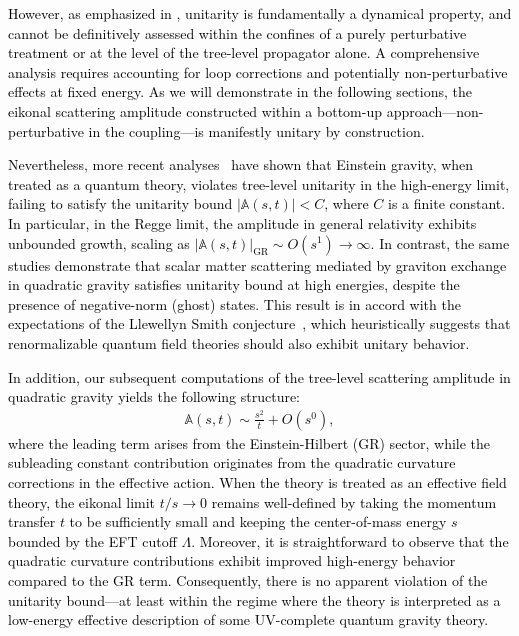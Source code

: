 \textcolor{black}{
However, as emphasized in \cite{FRADKIN1982469}, unitarity is fundamentally a dynamical property, and cannot be definitively assessed within the confines of a purely perturbative treatment or at the level of the tree-level propagator alone. A comprehensive analysis requires accounting for loop corrections and potentially non-perturbative effects at fixed energy. As we will demonstrate in the following sections, the eikonal scattering amplitude constructed within a bottom-up approach—non-perturbative in the coupling—is manifestly unitary by construction.
 } \par
 \textcolor{black}{
Nevertheless, more recent analyses~\cite{Abe:2017abx,Abe:2018rwb,Abe:2020ikj,Abe:2022spe} have shown that Einstein gravity, when treated as a quantum theory, violates tree-level unitarity in the high-energy limit, failing to satisfy the unitarity bound \( |\mathbb{A}(s,t)| < C \), where \( C \) is a finite constant. In particular, in the Regge limit, the amplitude in general relativity exhibits unbounded growth, scaling as \( |\mathbb{A}(s,t)|_{\textrm{GR}} \sim {O}(s^1) \to \infty \). In contrast, the same studies demonstrate that scalar matter scattering mediated by graviton exchange in quadratic gravity satisfies unitarity bound at high energies, despite the presence of negative-norm (ghost) states. This result is in accord with the expectations of the Llewellyn Smith conjecture~\cite{LLEWELLYNSMITH1973233}, which heuristically suggests that renormalizable quantum field theories should also exhibit unitary behavior.}\par
\textcolor{black}{In addition, our subsequent computations of the tree-level scattering amplitude in quadratic gravity yields the following structure:
\begin{align}
\mathbb{A}(s,t) \sim \frac{s^2}{t} + O(s^0) , 
\end{align}
where the leading term arises from the Einstein-Hilbert (GR) sector, while the subleading constant contribution originates from the quadratic curvature corrections in the effective action. When the theory is treated as an effective field theory, the eikonal limit \( t/s \to 0 \) remains well-defined by taking the momentum transfer \( t \) to be sufficiently small and keeping the center-of-mass energy \( s \) bounded by the EFT cutoff \( \Lambda \). Moreover, it is straightforward to observe that the quadratic curvature contributions exhibit improved high-energy behavior compared to the GR term. Consequently, there is no apparent violation of the unitarity bound---at least within the regime where the theory is interpreted as a low-energy effective description of some UV-complete quantum gravity theory.}


